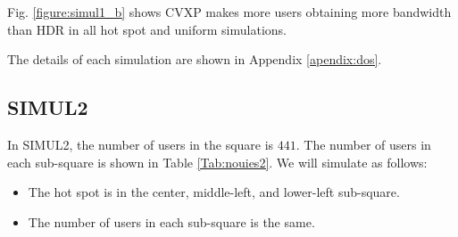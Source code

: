 	Fig. \ref{figure:simul1_b} shows CVXP makes more users obtaining more bandwidth than HDR in all hot spot and uniform simulations.
	
	The details of each simulation are shown in Appendix \ref{apendix:dos}.
	
\subsection{SIMUL2}
	In SIMUL2, the number of users in the square is $441$. The number of users in each sub-square is shown in Table \ref{Tab:nouies2}. We will simulate as follows: 
	\begin{itemize}
		\item The hot spot is in the center, middle-left, and lower-left sub-square.
		\item The number of users in each sub-square is the same.
	\end{itemize}
	
